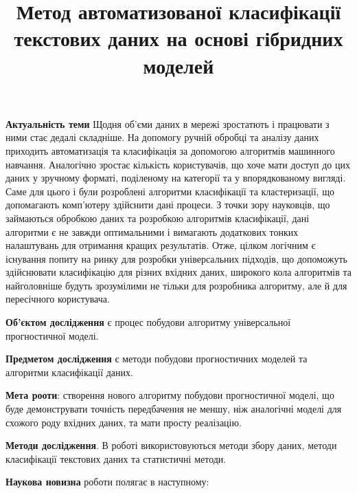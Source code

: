 \documentclass[14pt]{article}
\begin{document}
\title{Метод автоматизованої класифікації текстових даних на основі гібридних моделей}

\textbf{Актуальність теми} Щодня об'єми даних в мережі зростатють і працювати з ними стає дедалі складніше. На допомогу ручній обробці та аналізу даних приходить автоматизація та класифікація за допомогою алгоритмів машинного навчання. Аналогічно зростає кількість користувачів, що хоче мати доступ до цих даних у зручному форматі, поділеному на категорії та у впорядкованому вигляді. Саме для цього і були розроблені алгоритми класифікації та кластеризації, що допомагають комп'ютеру здійснити дані процеси. З точки зору науковців, що займаються обробкою даних та розробкою алгоритмів класифікації, дані алгоритми є не завжди оптимальними і вимагають додаткових тонких налаштувань для отримання кращих результатів. Отже, цілком логічним є існування попиту на ринку для розробки універсальних підходів, що допоможуть здійснювати класифікацію для різних вхідних даних, широкого кола алгоритмів та найголовніше будуть зрозумілими не тільки для розробника алгоритму, але й для пересічного користувача.

\textbf{Об'єктом дослідження} є процес побудови алгоритму універсальної прогностичної моделі.

\textbf{Предметом дослідження} є методи побудови прогностичних моделей та алгоритми класифікації даних.

\textbf{Мета рооти}: створення нового алгоритму побудови прогностичної моделі, що буде демонструвати точність передбачення не меншу, ніж аналогічні моделі для схожого роду вхідних даних, та мати просту реалізацію.

\textbf{Методи дослідження}. В роботі використовуються методи збору даних, методи класифікації текстових даних та статистичні методи.

\textbf{Наукова новизна} роботи полягає в наступному:
\end{document}
